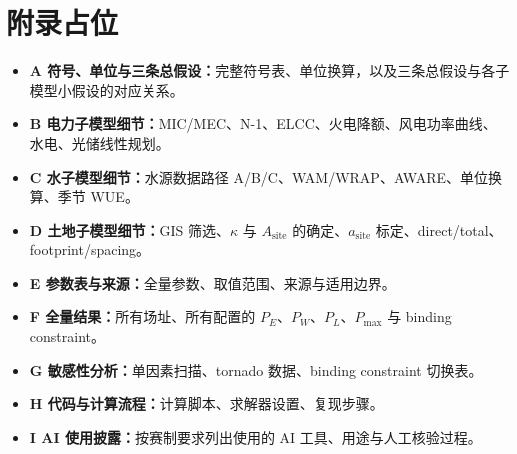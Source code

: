 \documentclass{mcmthesis}
\begin{document}
\section{附录占位}
\begin{itemize}
\item \textbf{A 符号、单位与三条总假设：}完整符号表、单位换算，以及三条总假设与各子模型小假设的对应关系。
\item \textbf{B 电力子模型细节：}MIC/MEC、N-1、ELCC、火电降额、风电功率曲线、水电、光储线性规划。
\item \textbf{C 水子模型细节：}水源数据路径 A/B/C、WAM/WRAP、AWARE、单位换算、季节 WUE。
\item \textbf{D 土地子模型细节：}GIS 筛选、\(\kappa\) 与 \(A_{\mathrm{site}}\) 的确定、\(a_{\mathrm{site}}\) 标定、direct/total、footprint/spacing。
\item \textbf{E 参数表与来源：}全量参数、取值范围、来源与适用边界。
\item \textbf{F 全量结果：}所有场址、所有配置的 \(P_E\)、\(P_W\)、\(P_L\)、\(P_{\max}\) 与 binding constraint。
\item \textbf{G 敏感性分析：}单因素扫描、tornado 数据、binding constraint 切换表。
\item \textbf{H 代码与计算流程：}计算脚本、求解器设置、复现步骤。
\item \textbf{I AI 使用披露：}按赛制要求列出使用的 AI 工具、用途与人工核验过程。
\end{itemize}
\end{document}

